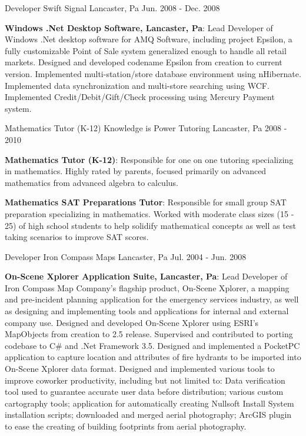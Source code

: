 \begin{cventries}
{\begin{cvitems}
      \end{cvitems}
    }
  \cventry
    {Developer}
    {Swift Signal}
    {Lancaster,  Pa}
    {Jun. 2008 - Dec. 2008}
    {
      \begin{cvitems}
        \item {\textbf{Windows .Net Desktop Software, Lancaster, Pa}: Lead Developer of Windows .Net desktop software for AMQ Software, including project Epsilon, a fully customizable Point of Sale system generalized enough to handle all retail markets. Designed and developed codename Epsilon from creation to current version. Implemented multi-station/store database environment using nHibernate. Implemented data synchronization and multi-store searching using WCF. Implemented Credit/Debit/Gift/Check processing using Mercury Payment system.}
      \end{cvitems}
    }
  \cventry
    {Mathematics Tutor (K-12)}
    {Knowledge is Power Tutoring}
    {Lancaster, Pa}
    {2008 - 2010}
    {
      \begin{cvitems}
        \item {\textbf{Mathematics Tutor (K-12)}: Responsible for one on one tutoring specializing in mathematics.  Highly rated by parents, focused primarily on advanced mathematics from advanced algebra to calculus.}
        \item {\textbf{Mathematics SAT Preparations Tutor}: Responsible for small group SAT preparation specializing in mathematics.  Worked with moderate class sizes (15 - 25) of high school students to help solidify mathematical concepts as well as test taking scenarios to improve SAT scores.}
      \end{cvitems}
    }
  \cventry
    {Developer}
    {Iron Compass Maps}
    {Lancaster, Pa}
    {Jul. 2004 - Jun. 2008}
    {
      \begin{cvitems}
        \item {\textbf{On-Scene Xplorer Application Suite, Lancaster, Pa}: Lead Developer of Iron Compass Map Company’s flagship product, On-Scene Xplorer, a mapping and pre-incident planning application for the emergency services industry, as well as designing and implementing tools and applications for internal and external company use. Designed and developed On-Scene Xplorer using ESRI’s MapObjects from creation to 2.5 release. Supervised and contributed to porting codebase to C\# and .Net Framework 3.5. Designed and implemented a PocketPC application to capture location and attributes of fire hydrants to be imported into On-Scene Xplorer data format. Designed and implemented various tools to improve coworker productivity, including but not limited to: Data verification tool used to guarantee accurate user data before distribution; various custom cartography tools; application for automatically creating Nullsoft Install System installation scripts; downloaded and merged aerial photography; ArcGIS plugin to ease the creating of building footprints from aerial photography.}
      \end{cvitems}
    }
\end{cventries}
